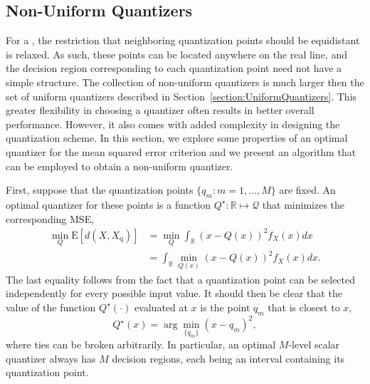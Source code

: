 \subsection{Non-Uniform Quantizers}
\label{section:NonUniformQuantizers}

For a , the restriction that neighboring quantization points should be equidistant is relaxed.
As such, these points can be located anywhere on the real line, and the decision region corresponding to each quantization point need not have a simple structure.
The collection of non-uniform quantizers is much larger then the set of uniform quantizers described in Section~\ref{section:UniformQuantizers}.
This greater flexibility in choosing a quantizer often results in better overall performance.
However, it also comes with added complexity in designing the quantization scheme.
In this section, we explore some properties of an optimal quantizer for the mean squared error criterion and we present an algorithm that can be employed to obtain a non-uniform quantizer.

First, suppose that the quantization points $\{ q_m : m = 1, \ldots, M \}$ are fixed.
An optimal quantizer for these points is a function $Q^{\star} : \mathbb{R} \mapsto \mathcal{Q}$ that minimizes the corresponding MSE,
\begin{equation*}
\begin{split}
\min_Q \mathrm{E} [ d(X, X_{\mathrm{q}}) ]
&= \min_Q \int_{\mathbb{R}} (x - Q(x))^2 f_X(x) dx \\
&= \int_{\mathbb{R}} \min_{Q(x)} (x - Q(x))^2 f_X(x) dx .
\end{split}
\end{equation*}
The last equality follows from the fact that a quantization point can be selected independently for every possible input value.
It should then be clear that the value of the function $Q^{\star}(\cdot)$ evaluated at $x$ is the point $q_m$ that is closest to $x$,
\begin{equation*}
Q^{\star}(x) = \arg \min_{\{ q_m \}} (x - q_m)^2 ,
\end{equation*}
where ties can be broken arbitrarily.
In particular, an optimal $M$-level scalar quantizer always has $M$ decision regions, each being an interval containing its quantization point.

